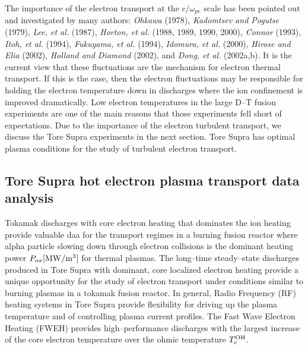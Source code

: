 \documentclass[a4paper,openany,12pt]{book}
\begin{document}
The importance of the electron transport at the $c/\omega_{pe}$ scale has been pointed out and investigated by many authors: \emph{Ohkawa} (1978), \emph{Kadomtsev and Pogutse} (1979), \emph{Lee, et al.} (1987), \emph{Horton, et al.} (1988, 1989, 1990, 2000), \emph{Connor} (1993), \emph{Itoh, et al.} (1994), \emph{Fukuyama, et al.} (1994), \emph{Idomura, et al.} (2000), \emph{Hirose and Elia} (2002), \emph{Holland and Diamond} (2002), and \emph{Dong, et al.} (2002a,b). It is the current view that these fluctuations are the mechanism for electron thermal transport. If this is the case, then the electron fluctuations may be responsible for holding the electron temperature down in discharges where the ion confinement is improved dramatically. Low electron temperatures in the large D--T fusion experiments are one of the main reasons that those experiments fell short of expectations. Due to the importance of the electron turbulent transport, we discuss the Tore Supra experiments in the next section. Tore Supra has optimal plasma conditions for the study of turbulent electron transport.

\subsection{Tore Supra hot electron plasma transport data analysis}

Tokamak discharges with core electron heating that dominates the ion heating provide valuable daa for the transport regimes in a burning fusion reactor where alpha particle slowing down through electron collisions is the dominant heating power $P_{\alpha e}\rm [MW/m^3]$ for thermal plasmas. The long--time steady--state discharges produced in Tore Supra with dominant, core localized electron heating provide a unique opportunity for the study of electron transport under conditions similar to burning plasmas in a tokamak fusion reactor. In general, Radio Frequency (RF) heating systems in Tore Supra provide flexibility for driving up the plasma temperature and of controlling plasma current profiles. The Fast Wave Electron Heating (FWEH) provides high--performance discharges with the largest increase of the core electron temperature over the ohmic temperature $T_e^{\rm OH}$.
\end{document}
